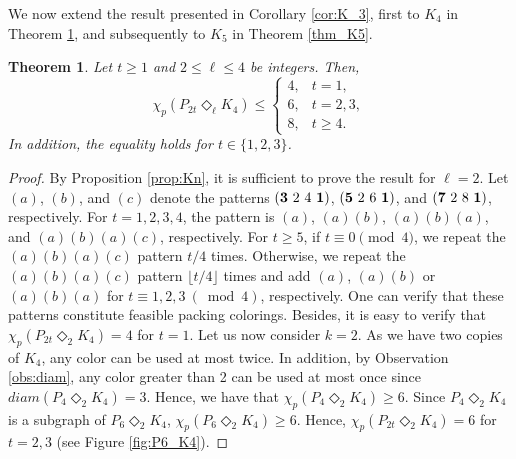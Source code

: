 \documentclass{article}
\newtheorem{theorem}{Theorem}
\begin{document}
We now extend the result presented in Corollary \ref{cor:K_3}, first to $K_4$ in Theorem \ref{thm_K4}, and subsequently to $K_5$ in Theorem \ref{thm_K5}.

\begin{theorem} \label{thm_K4}
Let $t\geq 1$ and $2 \leq \ell \leq 4$ be integers. Then, 
    $$\chi_p(P_{2t}\Diamond_\ell K_4)\leq\left\{
\begin{array}{ll}
4, & t=1,\\
6, & t=2, 3,\\
8, & t\geq 4.
\end{array}\right.
$$
In addition, the equality holds for $t\in\{1,2,3\}$.
\end{theorem}

\begin{proof}
   By Proposition \ref{prop:Kn}, it is sufficient to prove the result for $\ell=2$. Let $(a)$, $(b)$, and $(c)$ denote the patterns $({\bf 3}\ 2\ 4\ \bf 1)$, $({\bf 5}\ 2\ 6\ \bf 1)$, and $({\bf 7}\ 2\ 8\ \bf 1)$, respectively. For $t=1,2,3,4$, the pattern is $(a)$, $(a)(b)$, $(a)(b)(a)$, and $(a)(b)(a)(c)$, respectively. For $t \ge 5$, if $t \equiv 0 \pmod{4}$, we repeat the $(a)(b)(a)(c)$ pattern $t/4$ times. Otherwise, we repeat the $(a)(b)(a)(c)$ pattern $\lfloor t/4 \rfloor$ times and add $(a)$, $(a)(b)$ or $(a)(b)(a)$ for $t \equiv 1,2,3 \ (\bmod 4)$, respectively. One can verify that these patterns constitute feasible packing colorings. Besides, it is easy to verify that $\chi_p(P_{2t}\Diamond_2 K_4) = 4$ for $t=1$. Let us now consider $k=2$. As we have two copies of $K_4$, any color can be used at most twice. In addition, by Observation \ref{obs:diam}, any color greater than 2 can be used at most once since $diam(P_4 \Diamond_2 K_4)=3$. Hence, we have that $\chi_p(P_{4}\Diamond_2 K_4) \ge 6$. Since $P_4 \Diamond_2 K_4$ is a subgraph of $P_6 \Diamond_2 K_4$, $\chi_p(P_{6}\Diamond_2 K_4) \ge 6$. %
    Hence, $\chi_p(P_{2t}\Diamond_2 K_4) = 6$ for $t=2,3$ (see Figure \ref{fig:P6_K4}).
\end{proof}
\end{document}
